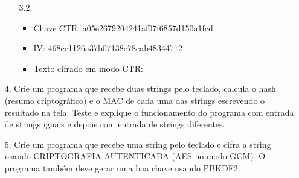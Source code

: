 \documentclass[12pt,a4paper]{article}
\begin{document}
\begin{enumerate}
\begin{enumerate}
					\item[3.2.]
						\begin{itemize}
							\item Chave CTR: a05e2679204241af07f6857d150a1fcd
							\item IV: 468ce1126a37b07138e78eab48344712
							\item Texto cifrado em modo CTR: 
						\end{itemize}
				\end{enumerate}
			
			\item[4.] Crie um programa que recebe duas strings pelo teclado, calcula o hash (resumo criptográfico) e o MAC de cada uma das strings escrevendo o resultado na tela. Teste e explique o funcionamento do programa com entrada de strings iguais e depois com entrada de strings diferentes.
			
			\item[5.] Crie um programa que recebe uma string pelo teclado e cifra a string usando CRIPTOGRAFIA AUTENTICADA (AES no modo GCM). O programa também deve gerar uma boa chave usando PBKDF2.
		\end{enumerate}	
\end{document}
